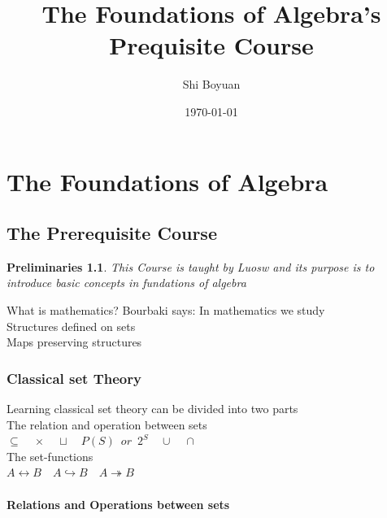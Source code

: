 \documentclass[13pt, a4paper, oneside]{book}
\title{\textbf{The Foundations of Algebra's Prequisite Course}}
\author{Shi Boyuan}
\date{\today}
\newtheorem*{Pre}{Preliminaries}
\begin{document}
	
	\maketitle
	\tableofcontents
	
	
	\chapter{The Foundations of Algebra} %
	
	\section{The Prerequisite Course} %
	
	\begin{Pre}
		This Course is taught by Luosw and its purpose is to introduce basic concepts in fundations of algebra
	\end{Pre}
	
	What is mathematics? Bourbaki says: In mathematics we study \\
	\hspace*{0.3cm} Structures defined on sets \\
	\hspace*{0.3cm} Maps preserving structures \\
	
	\subsection{Classical set Theory}  %
	
	Learning classical set theory can be divided into two parts \\
	\hspace*{0.3cm} The relation and operation between sets \\
	\hspace*{0.6cm} $\subseteq \quad \times \quad \sqcup \quad P\left( S \right) \enspace or \enspace 2^{S} \quad \cup \quad \cap$ \\
	\hspace*{0.3cm} The set-functions \\
	\hspace*{0.6cm} $ A \longleftrightarrow B \quad A \hookrightarrow B \quad A \twoheadrightarrow B $
	
	\subsubsection{Relations and Operations between sets}
	
\end{document}
